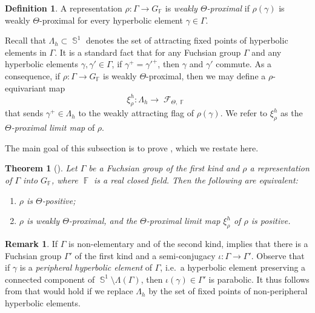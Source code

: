 \documentclass{amsart}
\theoremstyle{plain}
\newtheorem{theorem}[proposition]{Theorem}
\theoremstyle{definition}
\newtheorem{definition}[proposition]{Definition}
\newtheorem{remark}[proposition]{Remark}
\DeclareMathOperator{\Fc}{\mathcal{F}}
\DeclareMathOperator{\Fb}{{\mathbb{F}}}
\DeclareMathOperator{\Sb}{\mathbb{S}}
\newcommand*\from{\colon}
\newcommand{\1}{\mathbf{1}}
\begin{document}
\begin{definition}
    A representation $\rho \colon \Gamma \to G_{\Fb}$ is \emph{weakly $\Theta$-proximal} if $\rho(\gamma)$ is weakly $\Theta$-proximal for every hyperbolic element $\gamma \in \Gamma$.
\end{definition}

Recall that $\Lambda_h\subset \Sb^1$ denotes the set of attracting fixed points of hyperbolic elements in $\Gamma$. It is a standard fact that for any Fuchsian group $\Gamma$ and any hyperbolic elements $\gamma,\gamma'\in\Gamma$, if $\gamma^+=\gamma'^+$, then $\gamma$ and $\gamma'$ commute. As a consequence, if $\rho\colon\Gamma\to G_{\Fb}$ is weakly $\Theta$-proximal, then we may define a $\rho$-equivariant map 
\[\xi^h_\rho \from \Lambda_h \to \Fc_{\Theta,\Fb}\] 
that sends $\gamma^+\in\Lambda_h$ to the weakly attracting flag of $\rho(\gamma)$. We refer to $\xi^h_\rho$ as the \emph{$\Theta$-proximal limit map} of $\rho$.

The main goal of this subsection is to prove , which we restate here.

\begin{theorem}[]\label{theorem: limit map extends to proximal limit map}
    Let $\Gamma$ be a Fuchsian group of the first kind and $\rho$ a representation of $\Gamma$ into $G_{\Fb}$, where $\Fb$ is a real closed field.
    Then the following are equivalent:
    \begin{enumerate}
        \item
        \label{weak proximality: item positive}
        $\rho$ is $\Theta$-positive;
        \item 
        \label{weak proximality: item positive on fixed points}
        $\rho$ is weakly $\Theta$-proximal, and the $\Theta$-proximal limit map $\xi^h_\rho$ of $\rho$ is positive.
    \end{enumerate}
\end{theorem}

\begin{remark}
If $\Gamma$ is non-elementary and of the second kind,  implies that there is a Fuchsian group $\Gamma'$ of the first kind and a semi-conjugacy $\iota:\Gamma\to\Gamma'$. Observe that if $\gamma$ is a \emph{peripheral hyperbolic element} of $\Gamma$, i.e.\ a hyperbolic element preserving a connected component of $\Sb^1\setminus \Lambda(\Gamma)$, then $\iota(\gamma)\in \Gamma'$ is parabolic. It thus follows from  that  would hold if we replace $\Lambda_h$ by the set of fixed points of non-peripheral hyperbolic elements.
\end{remark}
\end{document}
